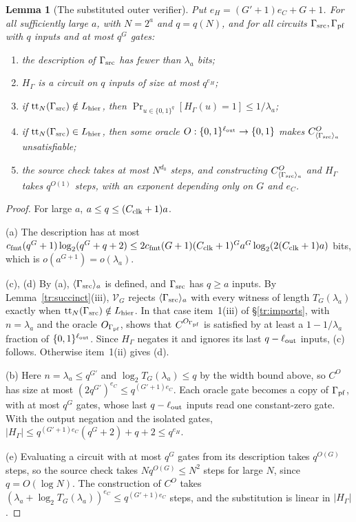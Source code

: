 \documentclass[11pt,letterpaper]{article}
\newtheorem{lemma}[theorem]{Lemma}
\theoremstyle{definition}
\theoremstyle{remark}
\begin{document}
\begin{lemma}[The substituted outer verifier]
\label{tr:outer}
Put $e_H=(G'+1)e_C+G+1$. For all sufficiently large $a$, with $N=2^a$
and $q=q(N)$, and for all circuits $\Gamma_{\rm src},\Gamma_{\rm pf}$
with $q$ inputs and at most $q^G$ gates:
\begin{enumerate}[label=(\alph*)]
\item the description of $\Gamma_{\rm src}$ has fewer than $\lambda_a$
bits;
\item $H_\Gamma$ is a circuit on $q$ inputs of size at most $q^{e_H}$;
\item if $\mathrm{tt}_N(\Gamma_{\rm src})\notin L_{\rm hier}$, then
$\Pr_{u\in\{0,1\}^q}[H_\Gamma(u)=1]\le1/\lambda_a$;
\item if $\mathrm{tt}_N(\Gamma_{\rm src})\in L_{\rm hier}$, then some
oracle $O:\{0,1\}^{\ell_{\rm out}}\to\{0,1\}$ makes
$C^O_{\langle\Gamma_{\rm src}\rangle_a}$ unsatisfiable;
\item the source check takes at most $N^{d_0}$ steps, and constructing
$C^O_{\langle\Gamma_{\rm src}\rangle_a}$ and $H_\Gamma$ takes $q^{O(1)}$
steps, with an exponent depending only on $G$ and $e_C$.
\end{enumerate}
\end{lemma}
\begin{proof}
For large $a$, $a\le q\le(C_{\rm clk}+1)a$.

(a) The description has at most
$c_{\rm fmt}(q^G+1)\log_2(q^G+q+2)\le
2c_{\rm fmt}(G+1)(C_{\rm clk}+1)^Ga^G\log_2(2(C_{\rm clk}+1)a)$
bits, which is $o(a^{G+1})=o(\lambda_a)$.

(c), (d) By (a), $\langle\Gamma_{\rm src}\rangle_a$ is defined, and
$\Gamma_{\rm src}$ has $q\ge a$ inputs. By Lemma~\ref{tr:succinct}(iii),
$\mathcal V_G$ rejects $\langle\Gamma_{\rm src}\rangle_a$ with every
witness of length $T_G(\lambda_a)$ exactly when
$\mathrm{tt}_N(\Gamma_{\rm src})\notin L_{\rm hier}$. In that case
item~1(iii) of \S\ref{tr:imports}, with $n=\lambda_a$ and the oracle
$O_{\Gamma_{\rm pf}}$, shows that $C^{O_{\Gamma_{\rm pf}}}$ is satisfied
by at least a $1-1/\lambda_a$ fraction of $\{0,1\}^{\ell_{\rm out}}$.
Since $H_\Gamma$ negates it and ignores its last $q-\ell_{\rm out}$
inputs, (c) follows. Otherwise item~1(ii) gives (d).

(b) Here $n=\lambda_a\le q^{G'}$ and
$\log_2T_G(\lambda_a)\le q$ by the width bound above, so $C^O$ has size at most
$(2q^{G'})^{e_C}\le q^{(G'+1)e_C}$. Each oracle gate becomes a copy of
$\Gamma_{\rm pf}$, with at most $q^G$ gates, whose last
$q-\ell_{\rm out}$ inputs read one constant-zero gate. With the output
negation and the isolated gates,
$|H_\Gamma|\le q^{(G'+1)e_C}(q^G+2)+q+2\le q^{e_H}$.

(e) Evaluating a circuit with at most $q^G$ gates from its description
takes $q^{O(G)}$ steps, so the source check takes $Nq^{O(G)}\le N^2$
steps for large $N$, since $q=O(\log N)$. The construction of $C^O$
takes $(\lambda_a+\log_2T_G(\lambda_a))^{e_C}\le q^{(G'+1)e_C}$ steps,
and the substitution is linear in $|H_\Gamma|$.
\end{proof}
\end{document}
